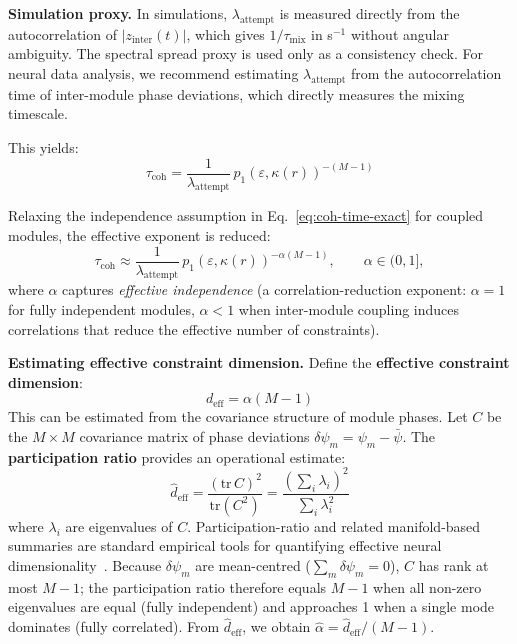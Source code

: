 \documentclass[12pt]{article}
\begin{document}
\textbf{Simulation proxy.} In simulations, $\lambda_{\mathrm{attempt}}$ is measured directly from the autocorrelation of $|z_{\mathrm{inter}}(t)|$, which gives $1/\tau_{\mathrm{mix}}$ in s$^{-1}$ without angular ambiguity. The spectral spread proxy is used only as a consistency check. For neural data analysis, we recommend estimating $\lambda_{\mathrm{attempt}}$ from the autocorrelation time of inter-module phase deviations, which directly measures the mixing timescale.

This yields:
\begin{equation}\label{eq:coh-time-exact}
\tau_{\mathrm{coh}} = \frac{1}{\lambda_{\mathrm{attempt}}}\,p_1(\varepsilon, \kappa(r))^{-(M-1)}
\end{equation}

Relaxing the independence assumption in Eq.~\ref{eq:coh-time-exact} for coupled modules, the effective exponent is reduced:
\begin{equation}\label{eq:coh-time}
\boxed{\tau_{\mathrm{coh}} \approx \frac{1}{\lambda_{\mathrm{attempt}}}\,p_1(\varepsilon, \kappa(r))^{-\alpha(M-1)}},\qquad \alpha\in(0,1],
\end{equation}
where $\alpha$ captures \emph{effective independence} (a correlation-reduction exponent: $\alpha = 1$ for fully independent modules, $\alpha < 1$ when inter-module coupling induces correlations that reduce the effective number of constraints).

\textbf{Estimating effective constraint dimension.} Define the \textbf{effective constraint dimension}:
\[
d_{\mathrm{eff}} = \alpha(M-1)
\]
This can be estimated from the covariance structure of module phases. Let $C$ be the $M \times M$ covariance matrix of phase deviations $\delta\psi_m = \psi_m - \bar{\psi}$. The \textbf{participation ratio} provides an operational estimate:
\begin{equation}\label{eq:deff-estimator}
\hat{d}_{\mathrm{eff}} = \frac{(\mathrm{tr}\, C)^2}{\mathrm{tr}(C^2)} = \frac{\left(\sum_i \lambda_i\right)^2}{\sum_i \lambda_i^2}
\end{equation}
where $\lambda_i$ are eigenvalues of $C$. Participation-ratio and related manifold-based summaries are standard empirical tools for quantifying effective neural dimensionality~\cite{cunningham2014,stringer2019}. Because $\delta\psi_m$ are mean-centred ($\sum_m \delta\psi_m = 0$), $C$ has rank at most $M-1$; the participation ratio therefore equals $M-1$ when all non-zero eigenvalues are equal (fully independent) and approaches 1 when a single mode dominates (fully correlated). From $\hat{d}_{\mathrm{eff}}$, we obtain $\hat{\alpha} = \hat{d}_{\mathrm{eff}} / (M-1)$.
\end{document}
